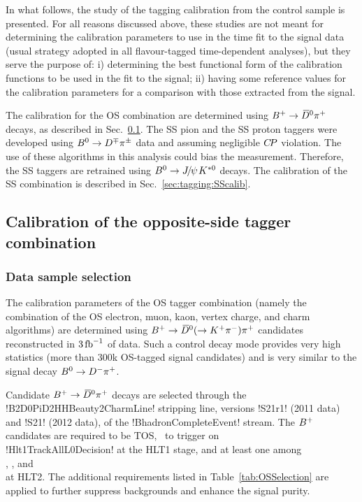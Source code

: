 In what follows, the study of the tagging calibration from the control sample is presented.
For all reasons discussed above, these studies are not meant for determining the calibration parameters to use in
the time fit to the signal data (usual strategy adopted in all flavour-tagged time-dependent analyses), but they
serve the purpose of: i) determining the best functional form of the calibration functions to be used in the fit to
the signal; ii) having some reference values for the calibration parameters for a comparison with those extracted
from the signal.

The calibration for the OS combination are determined using $B^+\rightarrow \kern 0.2em\overline{\kern -0.2em D}{}^0\pi^+$ decays, as
described in Sec.~\ref{sec:tagging:OScalib}. The SS pion and the SS proton taggers were developed
using $B^0\rightarrow D^\mp\pi^\pm$ data and assuming negligible $C\!P$ violation.
The use of these algorithms in this analysis could bias the measurement.
Therefore, the SS taggers are retrained using $\Bz\to\jpsi\Kstarz$ decays. The calibration of the SS
combination is described in Sec.~\ref{sec:tagging:SScalib}.

\subsection{Calibration of the opposite-side tagger combination}
\label{sec:tagging:OScalib}

\subsubsection{Data sample selection}
\label{sec:tagging:OScalib:selection}

The calibration parameters of the OS tagger combination (namely the combination of
the OS electron, muon, kaon, vertex charge, and charm algorithms) are determined using $B^+\rightarrow
\kern 0.2em\overline{\kern -0.2em D}{}^0(\rightarrow K^+\pi^-)\pi^+$ candidates reconstructed in $3\mbox{\,fb}^{-1}$ of data.
Such a control decay mode provides very high statistics (more than 300k OS-tagged signal candidates) and
is very similar to the signal decay $B^0\rightarrow D^-\pi^+$.

Candidate $B^+\rightarrow\kern 0.2em\overline{\kern -0.2em D}{}^0\pi^+$ decays are selected through the \spverb!B2D0PiD2HHBeauty2CharmLine! stripping line,
versions \spverb!S21r1! (2011 data) and \spverb!S21! (2012 data), of the \spverb!BhadronCompleteEvent! stream.
The $B^+$ candidates are required to be TOS, \ie~to trigger on \\
\spverb!Hlt1TrackAllL0Decision! at the HLT1 stage,
and at least one among \\
,
, and \\
 at HLT2.
The additional requirements listed in Table~\ref{tab:OSSelection} are applied to further
suppress backgrounds and enhance the signal purity.

